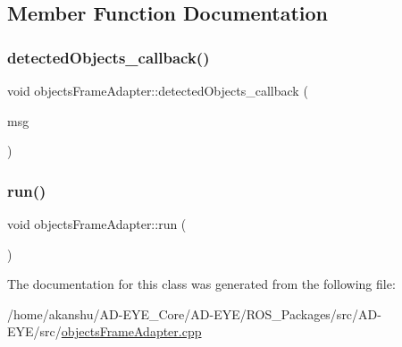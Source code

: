 \subsection{Member Function Documentation}
\mbox{\label{classobjectsFrameAdapter_acb4faa4bfc31edcdf2bce366f2f18fb3}} 
\subsubsection{\texorpdfstring{detected\+Objects\+\_\+callback()}{detectedObjects\_callback()}}
{\footnotesize\ttfamily void objects\+Frame\+Adapter\+::detected\+Objects\+\_\+callback (\begin{DoxyParamCaption}\item[{autoware\+\_\+msgs\+::\+Detected\+Object\+Array}]{msg }\end{DoxyParamCaption})\hspace{0.3cm}{\ttfamily [inline]}}

\mbox{\label{classobjectsFrameAdapter_a20db2f4261d72f1d5d9e360c78e07791}} 
\subsubsection{\texorpdfstring{run()}{run()}}
{\footnotesize\ttfamily void objects\+Frame\+Adapter\+::run (\begin{DoxyParamCaption}{ }\end{DoxyParamCaption})\hspace{0.3cm}{\ttfamily [inline]}}



The documentation for this class was generated from the following file\+:\begin{DoxyCompactItemize}
\item 
/home/akanshu/\+A\+D-\/\+E\+Y\+E\+\_\+\+Core/\+A\+D-\/\+E\+Y\+E/\+R\+O\+S\+\_\+\+Packages/src/\+A\+D-\/\+E\+Y\+E/src/\hyperlink{objectsFrameAdapter_8cpp}{objects\+Frame\+Adapter.\+cpp}\end{DoxyCompactItemize}

